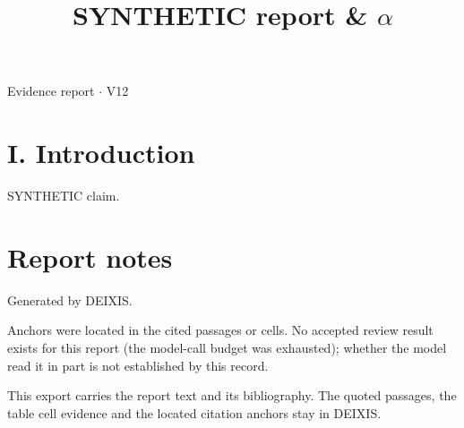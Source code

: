 \documentclass[journal]{IEEEtran}
\begin{document}
\title{SYNTHETIC report \& \ensuremath{\alpha}}

\maketitle

\noindent Evidence report \ensuremath{\cdot} V12

\section*{I. Introduction}

SYNTHETIC claim. \cite{Synth26}

\section*{Report notes}

Generated by DEIXIS.

Anchors were located in the cited passages or cells. No accepted review result exists for this report (the model-call budget was exhausted); whether the model read it in part is not established by this record.

This export carries the report text and its bibliography. The quoted passages, the table cell evidence and the located citation anchors stay in DEIXIS.




\end{document}
